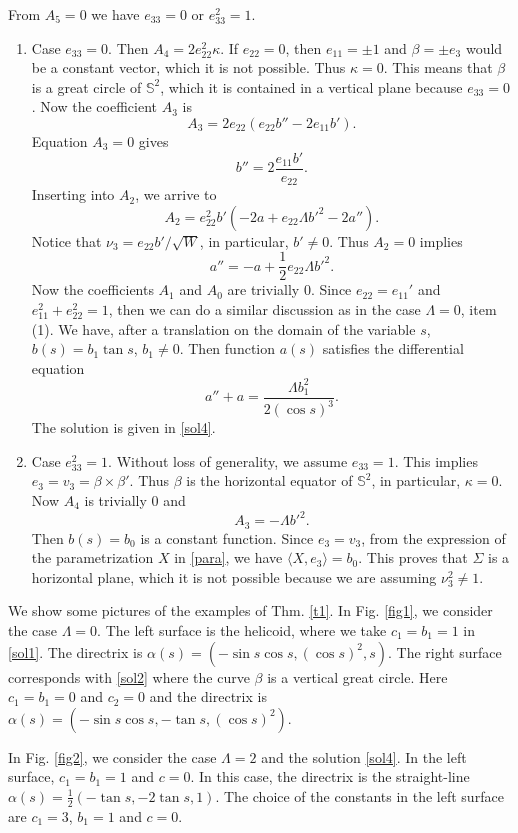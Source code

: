 \documentclass[12pt,a4paper,reqno]{amsart}
\def\s{\mathbb S}
\begin{document}
From $A_5=0$ we have $e_{33}=0$ or $e_{33}^2=1$.
\begin{enumerate}
\item Case $e_{33}=0$. Then $A_4=2e_{22}^2\kappa$. If $e_{22}=0$, then $e_{11}=\pm 1$ and $\beta=\pm e_3$ would be a constant vector, which it is not possible. Thus $\kappa=0$. This means that $\beta$ is a great circle of $\s^2$, which it is contained in a vertical plane because   $e_{33}=0$. Now the coefficient $A_3$ is
$$A_3=2e_{22}(e_{22}b''-2e_{11}b').$$
Equation $A_3=0$ gives
$$b''=2\frac{e_{11}b'}{e_{22}}.$$
Inserting into $A_2$, we arrive to
$$A_2=e_{22}^2 b'(-2a+e_{22}\Lambda b'^2-2a'').$$
Notice that $\nu_3=e_{22}b'/\sqrt{W}$, in particular, $b'\not=0$. Thus $A_2=0$ implies
$$a''=-a+\frac12e_{22}\Lambda b'^2.$$
Now the coefficients $A_1$ and $A_0$ are trivially $0$. Since $e_{22}=e_{11}'$ and $e_{11}^2+e_{22}^2=1$, then we can do a similar discussion as in the case $\Lambda=0$, item (1). We have, after a translation on the domain of the variable $s$, $b(s)=b_1\tan s$, $b_1\not=0$.   Then function $a(s)$ satisfies the differential equation 
$$a''+a=\frac{\Lambda b_1^2}{2(\cos s)^3}.$$
The solution is given in \eqref{sol4}.






\item Case $e_{33}^2=1$. Without loss of generality, we assume $e_{33}=1$. This implies $e_3=v_3=\beta\times\beta'$. Thus $\beta$ is the horizontal  equator of $\s^2$, in particular, $\kappa=0$. Now $A_4$ is trivially $0$ and 
$$A_3=-\Lambda b'^2.$$
Then $b(s)=b_0$ is a constant function. Since $e_3=v_3$, from the expression of the parametrization $X$ in \eqref{para}, we have $\langle X,e_3\rangle=b_0$. This proves that $\Sigma$ is a horizontal plane, which it is not possible because we are assuming $\nu_3^2\not=1$.  
\end{enumerate}

We show some pictures of the examples of Thm. \ref{t1}. In Fig. \ref{fig1}, we consider the case $\Lambda=0$. The left surface is the helicoid, where we take $c_1=b_1=1$ in \eqref{sol1}. The directrix is $\alpha(s)=(-\sin s\cos s,(\cos s)^2, s)$. The right surface corresponds with \eqref{sol2} where the curve $\beta$ is a vertical great circle. Here $c_1=b_1=0$ and $c_2=0$ and the directrix is $\alpha(s)=(-\sin s\cos s,-\tan s,(\cos s)^2)$. 

In Fig. \ref{fig2}, we consider the case $\Lambda=2$ and the solution \eqref{sol4}. In the left surface, $c_1=b_1=1$ and $c=0$. In this case, the directrix is the straight-line $\alpha(s)=\frac12(-\tan s,-2\tan s,1)$. The choice of the constants in the left surface are $c_1=3$, $b_1=1$ and $c=0$.
\end{document}
